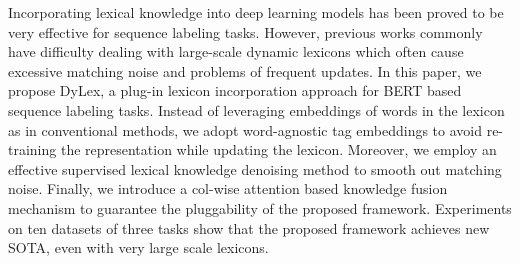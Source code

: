 Incorporating lexical knowledge into deep learning models has been proved to be very effective for sequence labeling tasks. However, previous works commonly have difficulty dealing with large-scale dynamic lexicons which often cause excessive matching noise and problems of frequent updates. In this paper, we propose DyLex, a plug-in lexicon incorporation approach for BERT based sequence labeling tasks. Instead of leveraging embeddings of words in the lexicon as in conventional methods, we adopt word-agnostic tag embeddings to avoid re-training the representation while updating the lexicon. Moreover, we employ an effective supervised lexical knowledge denoising method to smooth out matching noise. Finally, we introduce a col-wise attention based knowledge fusion mechanism to guarantee the pluggability of the proposed framework. Experiments on ten datasets of three tasks show that the proposed framework achieves new SOTA, even with very large scale lexicons.
